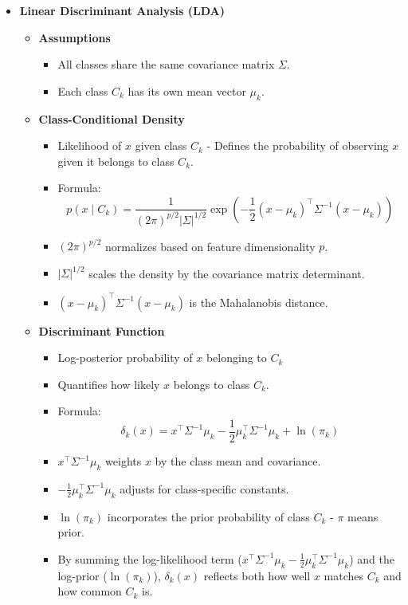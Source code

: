 \documentclass[12pt]{article}
\begin{document}
\begin{itemize}
    \item \textbf{Linear Discriminant Analysis (LDA)}
    \begin{itemize}
        \item \textbf{Assumptions}
        \begin{itemize}
            \item All classes share the same covariance matrix $\Sigma$.
            \item Each class $C_k$ has its own mean vector $\mu_k$.
        \end{itemize}
        \item \textbf{Class-Conditional Density}
        \begin{itemize}
            \item Likelihood of $x$ given class $C_k$ - Defines the probability of observing $x$ given it belongs to class $C_k$.
            \item Formula: 
            \[
            p(x \mid C_k) = \frac{1}{(2\pi)^{p/2} |\Sigma|^{1/2}} \exp\left(-\frac{1}{2}(x-\mu_k)^\top \Sigma^{-1}(x-\mu_k)\right)
            \]
            \item $(2\pi)^{p/2}$ normalizes based on feature dimensionality $p$.
            \item $|\Sigma|^{1/2}$ scales the density by the covariance matrix determinant.
            \item $(x-\mu_k)^\top \Sigma^{-1}(x-\mu_k)$ is the Mahalanobis distance.
        \end{itemize}
        \item \textbf{Discriminant Function}
        \begin{itemize}
            \item Log-posterior probability of $x$ belonging to $C_k$
            \item Quantifies how likely $x$ belongs to class $C_k$.
            \item Formula: 
            \[
            \delta_k(x) = x^\top \Sigma^{-1} \mu_k - \frac{1}{2}\mu_k^\top \Sigma^{-1}\mu_k + \ln(\pi_k)
            \]
            \item $x^\top \Sigma^{-1} \mu_k$ weights $x$ by the class mean and covariance.
            \item $-\frac{1}{2}\mu_k^\top \Sigma^{-1}\mu_k$ adjusts for class-specific constants.
            \item $\ln(\pi_k)$ incorporates the prior probability of class $C_k$ - $\pi$ means prior.
            \item By summing the log-likelihood term ($x^\top \Sigma^{-1} \mu_k - \frac{1}{2}\mu_k^\top \Sigma^{-1}\mu_k$) and the log-prior ($\ln(\pi_k)$), $\delta_k(x)$ reflects both how well $x$ matches $C_k$ and how common $C_k$ is.

\end{itemize}
\end{itemize}
\end{itemize}
\end{document}
